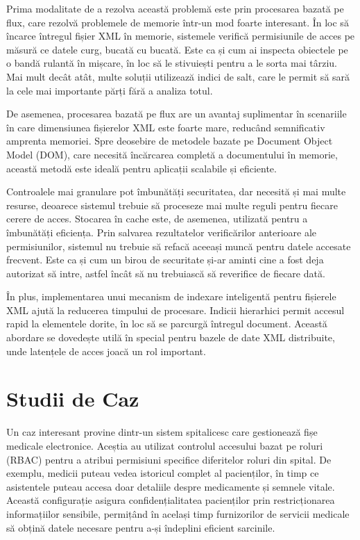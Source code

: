 \documentclass[runningheads]{llncs}
\begin{document}
\begin{spacing}{1.5}
Prima modalitate de a rezolva această problemă este prin procesarea bazată pe flux, care rezolvă problemele de memorie într-un mod foarte interesant. În loc să încarce întregul fișier XML în memorie, sistemele verifică permisiunile de acces pe măsură ce datele curg, bucată cu bucată. Este ca și cum ai inspecta obiectele pe o bandă rulantă în mișcare, în loc să le stivuiești pentru a le sorta mai târziu. Mai mult decât atât, multe soluții utilizează indici de salt, care le permit să sară la cele mai importante părți fără a analiza totul.

De asemenea, procesarea bazată pe flux are un avantaj suplimentar în scenariile în care dimensiunea fișierelor XML este foarte mare, reducând semnificativ amprenta memoriei. Spre deosebire de metodele bazate pe Document Object Model (DOM), care necesită încărcarea completă a documentului în memorie, această metodă este ideală pentru aplicații scalabile și eficiente.

Controalele mai granulare pot îmbunătăți securitatea, dar necesită și mai multe resurse, deoarece sistemul trebuie să proceseze mai multe reguli pentru fiecare cerere de acces. Stocarea în cache este, de asemenea, utilizată pentru a îmbunătăți eficiența. Prin salvarea rezultatelor verificărilor anterioare ale permisiunilor, sistemul nu trebuie să refacă aceeași muncă pentru datele accesate frecvent. Este ca și cum un birou de securitate și-ar aminti cine a fost deja autorizat să intre, astfel încât să nu trebuiască să reverifice de fiecare dată.

În plus, implementarea unui mecanism de indexare inteligentă pentru fișierele XML ajută la reducerea timpului de procesare. Indicii hierarhici permit accesul rapid la elementele dorite, în loc să se parcurgă întregul document. Această abordare se dovedește utilă în special pentru bazele de date XML distribuite, unde latențele de acces joacă un rol important.

\section{Studii de Caz}
Un caz interesant provine dintr-un sistem spitalicesc care gestionează fișe medicale electronice. Aceștia au utilizat controlul accesului bazat pe roluri (RBAC) pentru a atribui permisiuni specifice diferitelor roluri din spital. De exemplu, medicii puteau vedea istoricul complet al pacienților, în timp ce asistentele puteau accesa doar detaliile despre medicamente și semnele vitale. Această configurație asigura confidențialitatea pacienților prin restricționarea informațiilor sensibile, permițând în același timp furnizorilor de servicii medicale să obțină datele necesare pentru a-și îndeplini eficient sarcinile.


\end{spacing}
\end{document}
